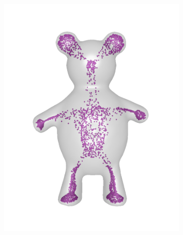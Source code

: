 \documentclass[annual]{acmsiggraph}
\begin{document}
\begin{figure}
\begin{subfigure}[b]{0.19\linewidth}
                \includegraphics[width=\textwidth]{images/bear/1.pdf}
        \end{subfigure}
~
		\begin{subfigure}[b]{0.19\linewidth}
                \centering

\end{subfigure}
\end{figure}
\end{document}
